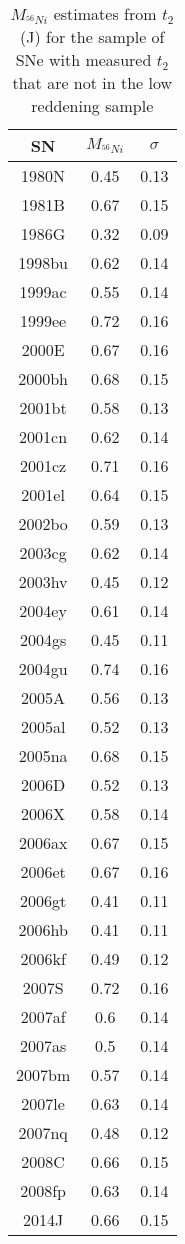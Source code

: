 \begin{table}
\begin{center}
\caption{$M_{^{56}Ni}$ estimates from $t_2$ (J) for the sample of SNe with measured $t_2$ that are not in the low reddening sample}
\begin{tabular}{ccc}
\hline
SN & $M_{^{56}Ni}$ & $\sigma$ \\
\hline
1980N & 0.45 & 0.13 \\
1981B & 0.67 & 0.15 \\
1986G & 0.32 & 0.09 \\
1998bu & 0.62 & 0.14 \\
1999ac & 0.55 & 0.14 \\
1999ee & 0.72 & 0.16 \\
2000E & 0.67 & 0.16 \\
2000bh & 0.68 & 0.15 \\
2001bt & 0.58 & 0.13 \\
2001cn & 0.62 & 0.14 \\
2001cz & 0.71 & 0.16 \\
2001el & 0.64 & 0.15 \\
2002bo & 0.59 & 0.13 \\
2003cg & 0.62 & 0.14 \\
2003hv & 0.45 & 0.12 \\
2004ey & 0.61 & 0.14 \\
2004gs & 0.45 & 0.11 \\
2004gu & 0.74 & 0.16 \\
2005A & 0.56 & 0.13 \\
2005al & 0.52 & 0.13 \\
2005na & 0.68 & 0.15 \\
2006D & 0.52 & 0.13 \\
2006X & 0.58 & 0.14 \\
2006ax & 0.67 & 0.15 \\
2006et & 0.67 & 0.16 \\
2006gt & 0.41 & 0.11 \\
2006hb & 0.41 & 0.11 \\
2006kf & 0.49 & 0.12 \\
2007S & 0.72 & 0.16 \\
2007af & 0.6 & 0.14 \\
2007as & 0.5 & 0.14 \\
2007bm & 0.57 & 0.14 \\
2007le & 0.63 & 0.14 \\
2007nq & 0.48 & 0.12 \\
2008C & 0.66 & 0.15 \\
2008fp & 0.63 & 0.14 \\
2014J & 0.66 & 0.15 \\
\hline
\end{tabular}
\end{center}
\label{tab:comp_ni}
\end{table}
